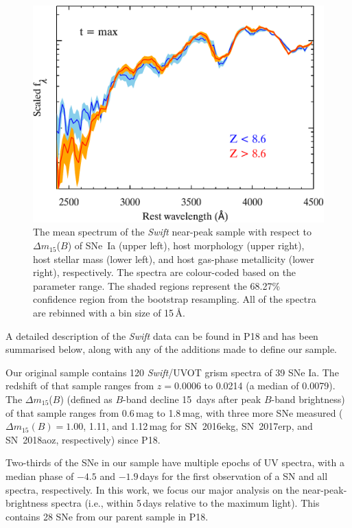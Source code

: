 \documentclass[useAMS,usenatbib]{mn2e}
\newcommand{\deltam}{\ensuremath{\Delta m_{15}}}
\begin{document}
\begin{figure}
		\hspace{0.25cm}
		\includegraphics[scale=0.49]{plot/mean_spec_max_metal_log.pdf}
                \caption{The mean spectrum of the {\it Swift} near-peak sample with respect to $\deltam$($B$) of SNe~Ia (upper left), host morphology (upper right), host stellar mass (lower left), and host gas-phase metallicity (lower right), respectively. The spectra are colour-coded based on the parameter range. The shaded regions represent the 68.27\% confidence region from the bootstrap resampling. All of the spectra are rebinned with a bin size of 15\,\AA.}
        \label{mean-spec}
\end{figure}

A detailed description of the {\it Swift} data can be found in P18 and has been summarised below, along with any of the additions made to define our sample.

Our original sample contains 120 {\it Swift}/UVOT grism spectra of 39 SNe Ia. The redshift of that sample ranges from $z = 0.0006$ to 0.0214 (a median of 0.0079). The $\deltam$($B$) (defined as $B$-band decline 15~days after peak $B$-band brightness) of that sample ranges from 0.6\,mag to 1.8\,mag, with three more SNe measured ($\deltam(B) = 1.00$, 1.11, and 1.12\,mag for SN~2016ekg, SN~2017erp, and SN~2018aoz, respectively) since P18.

Two-thirds of the SNe in our sample have multiple epochs of UV spectra, with a median phase of $-4.5$ and $-1.9$\,days for the first observation of a SN and all spectra, respectively. In this work, we focus our major analysis on the near-peak-brightness spectra (i.e., within 5\,days relative to the maximum light). This contains 28 SNe from our parent sample in P18. 
\end{document}
